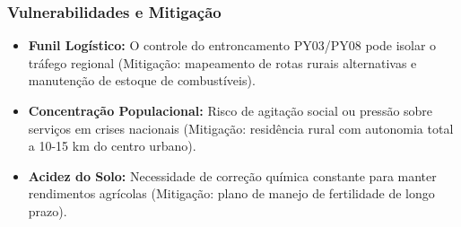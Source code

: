 \subsubsection{Vulnerabilidades e
Mitigação}

\begin{itemize}
\tightlist
\item
  \textbf{Funil Logístico:} O controle do entroncamento PY03/\allowbreak PY08 pode
  isolar o tráfego regional (Mitigação: mapeamento de rotas rurais
  alternativas e manutenção de estoque de combustíveis).
\item
  \textbf{Concentração Populacional:} Risco de agitação social ou
  pressão sobre serviços em crises nacionais (Mitigação: residência
  rural com autonomia total a 10-15 km do centro urbano).
\item
  \textbf{Acidez do Solo:} Necessidade de correção química constante
  para manter rendimentos agrícolas (Mitigação: plano de manejo de
  fertilidade de longo prazo).
\end{itemize}

